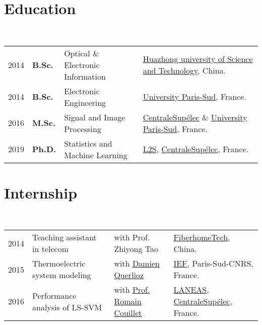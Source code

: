 \documentclass[a4paper,10pt]{article}
\begin{document}
\maketitle

\section{Education}
~\begin{tabular}{llll}
2014 & \textbf{B.Sc.} & Optical \& Electronic Information & \href{http://english.hust.edu.cn/}{Huazhong university of Science and Technology}, China. \\
2014 & \textbf{B.Sc.} & Electronic Engineering & \href{http://www.u-psud.fr/en/index.html}{University Paris-Sud}, France. \\
2016 & \textbf{M.Sc.} & Signal and Image Processing & \href{http://www.centralesupelec.fr}{CentraleSup\'elec} \& \href{http://www.u-psud.fr/en/index.html}{University Paris-Sud}, France. \\
2019 & \textbf{Ph.D.} & Statistics and Machine Learning & \href{https://www.l2s.centralesupelec.fr/}{L2S}, \href{http://www.centralesupelec.fr}{CentraleSup\'elec}, France.
\end{tabular}
%
%
%
%
%
\section{Internship}
~\begin{tabular}{llll}
2014 & Teaching assistant in telecom & with Prof. Zhiyong Tao & \href{http://www.fiberhomegroup.com/en/}{FiberhomeTech}, China. \\
2015 & Thermoelectric system modeling & with \href{https://sites.google.com/site/damienquerlioz/}{Damien Querlioz} & \href{http://www.ief.u-psud.fr/}{IEF}, Paris-Sud-CNRS, France. \\
2016 & Performance analysis of LS-SVM & with \href{http://romaincouillet.hebfree.org/}{Prof. Romain Couillet} & \href{http://www.laneas.com/}{LANEAS}, \href{http://www.centralesupelec.fr}{CentraleSup\'elec}, France.
\end{tabular}
%
%
%
%
%
\end{document}
